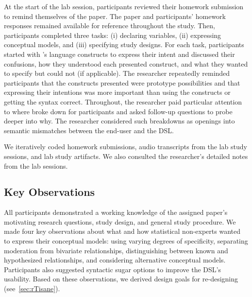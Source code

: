 
At the start of the lab session, participants reviewed their homework submission
to remind themselves of the paper. The paper and participants' homework
responses remained available for reference throughout the study. Then,
participants completed three tasks: (i) declaring variables, (ii) expressing
conceptual models, and (iii) specifying study designs. For each task,
participants started with \tisane's language constructs to express their intent
and discussed their confusions, how they understood each presented construct,
and what they wanted to specify but could not (if applicable). The researcher repeatedly reminded
participants that the constructs presented were prototype possibilities and that
expressing their intentions was more important than using the constructs or
getting the syntax correct. Throughout, the researcher paid particular attention
to where \tisane broke down for participants and asked follow-up questions to
probe deeper into why. The researcher considered such breakdowns as openings
into semantic mismatches between the end-user and the DSL.

We iteratively coded homework submissions, audio transcripts from the lab study
sessions, and lab study artifacts. We also consulted the
researcher's detailed notes from the lab sessions. 


\subsection{Key Observations}
All participants demonstrated a working knowledge of the assigned paper's
motivating research questions, study design, and general study procedure. 
We made four key observations about what and how statistical non-experts wanted
to express their conceptual models: using varying degrees of specificity,
separating moderation from bivariate relationships, distinguishing between known
and hypothesized relationships, and considering alternative conceptual models.
Participants also suggested syntactic sugar options to improve the DSL's
usability. Based on these observations, we derived design goals for re-designing
\tisane (see~\autoref{sec:rTisane}).

